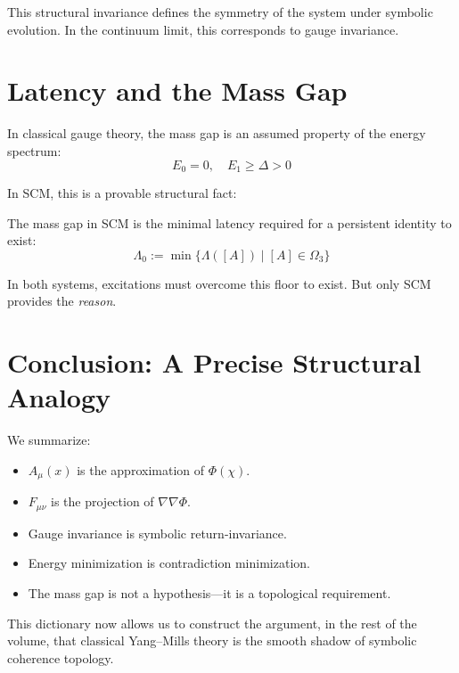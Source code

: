 This structural invariance defines the symmetry of the system under symbolic evolution. In the continuum limit, this corresponds to gauge invariance.

\section{Latency and the Mass Gap}

In classical gauge theory, the mass gap is an assumed property of the energy spectrum:
\[
E_0 = 0,\quad E_1 \geq \Delta > 0
\]

In SCM, this is a provable structural fact:

\begin{definition}
The mass gap in SCM is the minimal latency required for a persistent identity to exist:
\[
\Lambda_0 := \min \{ \Lambda([A]) \mid [A] \in \Omega_3 \}
\]
\end{definition}

In both systems, excitations must overcome this floor to exist. But only SCM provides the \emph{reason}.

\section{Conclusion: A Precise Structural Analogy}

We summarize:

\begin{itemize}
    \item $A_\mu(x)$ is the approximation of $\Phi(\chi)$.
    \item $F_{\mu\nu}$ is the projection of $\nabla\nabla \Phi$.
    \item Gauge invariance is symbolic return-invariance.
    \item Energy minimization is contradiction minimization.
    \item The mass gap is not a hypothesis---it is a topological requirement.
\end{itemize}

This dictionary now allows us to construct the argument, in the rest of the volume, that classical Yang--Mills theory is the smooth shadow of symbolic coherence topology.

